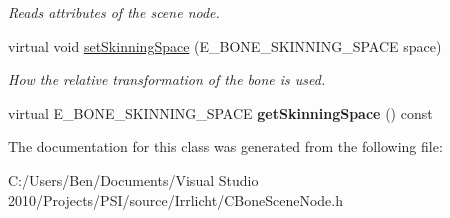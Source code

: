 \begin{DoxyCompactItemize}
\begin{DoxyCompactList}\small\item\em Reads attributes of the scene node. \end{DoxyCompactList}\item 
\hypertarget{classirr_1_1scene_1_1_c_bone_scene_node_af7deb666761c00bcc6f75fcaae596650}{virtual void \hyperlink{classirr_1_1scene_1_1_c_bone_scene_node_af7deb666761c00bcc6f75fcaae596650}{set\-Skinning\-Space} (E\-\_\-\-B\-O\-N\-E\-\_\-\-S\-K\-I\-N\-N\-I\-N\-G\-\_\-\-S\-P\-A\-C\-E space)}\label{classirr_1_1scene_1_1_c_bone_scene_node_af7deb666761c00bcc6f75fcaae596650}

\begin{DoxyCompactList}\small\item\em How the relative transformation of the bone is used. \end{DoxyCompactList}\item 
\hypertarget{classirr_1_1scene_1_1_c_bone_scene_node_af5fa23223eca0aa1f1dc5bffd236dd56}{virtual E\-\_\-\-B\-O\-N\-E\-\_\-\-S\-K\-I\-N\-N\-I\-N\-G\-\_\-\-S\-P\-A\-C\-E {\bfseries get\-Skinning\-Space} () const }\label{classirr_1_1scene_1_1_c_bone_scene_node_af5fa23223eca0aa1f1dc5bffd236dd56}

\end{DoxyCompactItemize}


The documentation for this class was generated from the following file\-:\begin{DoxyCompactItemize}
\item 
C\-:/\-Users/\-Ben/\-Documents/\-Visual Studio 2010/\-Projects/\-P\-S\-I/source/\-Irrlicht/C\-Bone\-Scene\-Node.\-h\end{DoxyCompactItemize}

